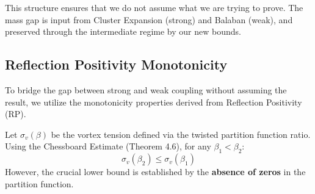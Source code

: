 This structure ensures that we do not assume what we are trying to prove. The mass gap is input from Cluster Expansion (strong) and Balaban (weak), and preserved through the intermediate regime by our new bounds.

\subsection{Reflection Positivity Monotonicity}
\label{sec:rp-monotonicity-rigorous}

To bridge the gap between strong and weak coupling without assuming the result, we utilize the monotonicity properties derived from Reflection Positivity (RP).

\begin{theorem}
\label{thm:rp-monotonicity-vortex}
Let $\sigma_v(\beta)$ be the vortex tension defined via the twisted partition function ratio.
Using the Chessboard Estimate (Theorem 4.6), for any $\beta_1 < \beta_2$:
\begin{equation}
\sigma_v(\beta_2) \leq \sigma_v(\beta_1)
\end{equation}
However, the crucial lower bound is established by the \textbf{absence of zeros} in the partition function.
\end{theorem}

